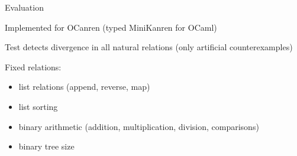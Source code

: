 \documentclass{beamer}
\theoremstyle{definition}
\theoremstyle{plain} %
\begin{document}
\begin{frame}{Evaluation}

Implemented for OCanren (typed MiniKanren for OCaml)

 \vskip8mm

Test detects divergence in all natural relations (only artificial counterexamples)

 \vskip8mm

Fixed relations:
 \begin{itemize}
 \item list relations (append, reverse, map)
 \item list sorting
 \item binary arithmetic (addition, multiplication, division, comparisons)
 \item binary tree size
 \end{itemize}
 
\end{frame}
\end{document}
